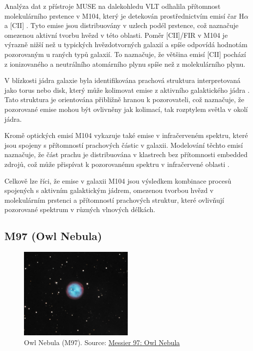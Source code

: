 \documentclass[a4paper,11pt,twocolumn]{article}
\begin{document}
            Analýza dat z přístroje MUSE na dalekohledu VLT odhalila přítomnost molekulárního prstence v M104, který je detekován prostřednictvím emisí čar $\text{H} \alpha$ a [CII] \citet{sutter2022}. Tyto emise jsou distribuovány v uzlech podél prstence, což naznačuje omezenou aktivní tvorbu hvězd v této oblasti. Poměr [CII]/FIR v M104 je výrazně nižší než u typických hvězdotvorných galaxií a spíše odpovídá hodnotám pozorovaným u raných typů galaxií. To naznačuje, že většina emisí [CII] pochází z ionizovaného a neutrálního atomárního plynu spíše než z molekulárního plynu. 
            
            V blízkosti jádra galaxie byla identifikována prachová struktura interpretovaná jako torus nebo disk, který může kolimovat emise z aktivního galaktického jádra \citet{menezes2013}. Tato struktura je orientována přibližně hranou k pozorovateli, což naznačuje, že pozorované emise mohou být ovlivněny jak kolimací, tak rozptylem světla v okolí jádra. 
            
            Kromě optických emisí M104 vykazuje také emise v infračerveném spektru, které jsou spojeny s přítomností prachových částic v galaxii. Modelování těchto emisí naznačuje, že část prachu je distribuována v klastrech bez přítomnosti embedded zdrojů, což může přispívat k pozorovanému spektru v infračervené oblasti \citet{delooze2012}. 
            
            Celkově lze říci, že emise v galaxii M104 jsou výsledkem kombinace procesů spojených s aktivním galaktickým jádrem, omezenou tvorbou hvězd v molekulárním prstenci a přítomností prachových struktur, které ovlivňují pozorované spektrum v různých vlnových délkách.

        \subsection{M97 (Owl Nebula)}            
            \begin{figure}
                \centering
                \includegraphics[width=0.5\textwidth]{M97.jpg}
                \caption{Owl Nebula (M97). Source: \href{https://www.messier-objects.com/messier-97-owl-nebula/}{Messier 97: Owl Nebula}}
                \label{fig:m97}
            \end{figure}
            
\end{document}
